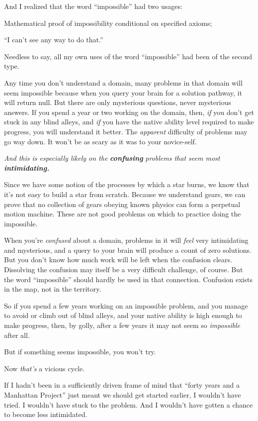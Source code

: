 {
 And I realized that the word
``impossible'' had two usages:}

{
 Mathematical proof of impossibility conditional on specified
axioms;}

{
 ``I can't see any way to do
that.''}

{
 Needless to say, all my own uses of the word
``impossible'' had been of the
second type.}

{
 Any time you don't understand a domain, many
problems in that domain will seem impossible because when you query
your brain for a solution pathway, it will return null. But there are
only mysterious questions, never mysterious answers. If you spend a
year or two working on the domain, then, \textit{if} you
don't get stuck in any blind alleys, and \textit{if}
you have the native ability level required to make progress, you will
understand it better. The \textit{apparent} difficulty of problems may
go way down. It won't be as scary as it was to your
novice-self.}

{
 \textit{And this is especially likely on the
}\textbf{\textit{confusing}} \textit{problems that seem most}
\textbf{\textit{intimidating.}}}

{
 Since we have some notion of the processes by which a star burns,
we know that it's not easy to build a star from
scratch. Because we understand gears, we can prove that no collection
of gears obeying known physics can form a perpetual motion machine.
These are not good problems on which to practice doing the impossible.}

{
 When you're \textit{confused} about a domain,
problems in it will \textit{feel} very intimidating and mysterious, and
a query to your brain will produce a count of zero solutions. But you
don't know how much work will be left when the
confusion clears. Dissolving the confusion may itself be a very
difficult challenge, of course. But the word
``impossible'' should hardly be used
in that connection. Confusion exists in the map, not in the territory.}

{
 So if you spend a few years working on an impossible problem, and
you manage to avoid or climb out of blind alleys, and your native
ability is high enough to make progress, then, by golly, after a few
years it may not seem so \textit{impossible} after all.}

{
 But if something seems impossible, you won't try.}

{
 Now \textit{that's} a vicious cycle.}

{
 If I hadn't been in a sufficiently driven frame of
mind that ``forty years and a Manhattan
Project'' just meant we should get started earlier, I
wouldn't have tried. I wouldn't have
stuck to the problem. And I wouldn't have gotten a
chance to become less intimidated.}

